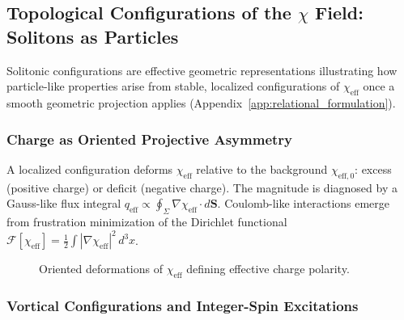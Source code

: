 \subsection{Topological Configurations of the
\texorpdfstring{$\chi$}{χ} Field: Solitons as Particles}
  \label{app:topological_solitons}

  Solitonic configurations are effective geometric representations
  illustrating how particle-like properties arise from stable, localized
  configurations of $\chi_{\mathrm{eff}}$ once a smooth geometric
  projection applies
  (Appendix~\ref{app:relational_formulation}).

  \subsubsection*{Charge as Oriented Projective Asymmetry}

    A localized configuration deforms $\chi_{\mathrm{eff}}$ relative to
    the background $\chi_{\mathrm{eff},0}$: excess (positive charge) or
    deficit (negative charge).
    The magnitude is diagnosed by a Gauss-like flux integral
    $q_{\mathrm{eff}} \propto
    \oint_\Sigma \nabla\chi_{\mathrm{eff}} \cdot d\mathbf{S}$.
    Coulomb-like interactions emerge from frustration minimization of the
    Dirichlet functional
    $\mathcal{F}[\chi_{\mathrm{eff}}]
    = \tfrac{1}{2}\int |\nabla\chi_{\mathrm{eff}}|^2\,d^3x$.

    \begin{figure}[h]
      \centering
      \caption{Oriented deformations of
        $\chi_{\mathrm{eff}}$ defining effective charge
        polarity.}
      \label{fig:chi_charges}
    \end{figure}

  \subsubsection*{Vortical Configurations and Integer-Spin
  Excitations}
    \label{subsec:vortices}

